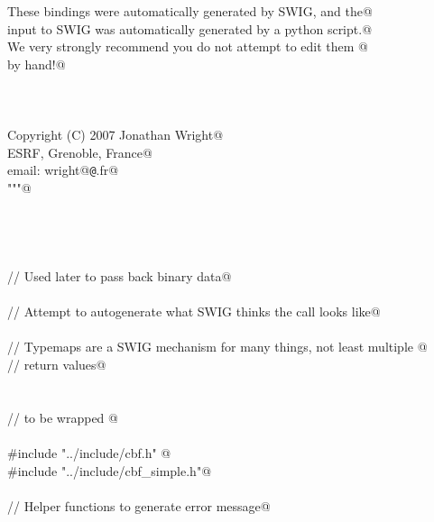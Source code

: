\documentclass[10pt,a4paper,twoside,notitlepage]{article}
\begin{document}
\begin{flushleft}
\begin{list}{}{}
\mbox{}\verb@ These bindings were automatically generated by SWIG, and the@\\
\mbox{}\verb@ input to SWIG was automatically generated by a python script.@\\
\mbox{}\verb@ We very strongly recommend you do not attempt to edit them @\\
\mbox{}\verb@ by hand!@\\
\mbox{}\verb@@\\
\mbox{}\verb@@\\
\mbox{}\verb@@\\
\mbox{}\verb@ Copyright (C) 2007    Jonathan Wright@\\
\mbox{}\verb@                       ESRF, Grenoble, France@\\
\mbox{}\verb@                email: wright@{\tt @}\verb@esrf.fr@\\
\mbox{}\verb@"""@\\
\mbox{}\verb@%}@\\
\mbox{}\verb@@\\
\mbox{}\verb@@\\
\mbox{}\verb@@\\
\mbox{}\verb@@\\
\mbox{}\verb@// Used later to pass back binary data@\\
\mbox{}\verb@%include "cstring.i"@\\
\mbox{}\verb@@\\
\mbox{}\verb@// Attempt to autogenerate what SWIG thinks the call looks like@\\
\mbox{}\verb@@\\
\mbox{}\verb@// Typemaps are a SWIG mechanism for many things, not least multiple @\\
\mbox{}\verb@// return values@\\
\mbox{}\verb@%include "typemaps.i"@\\
\mbox{}\verb@@\\
\mbox{}\verb@@\\
\mbox{}\verb@%{  // Here is the c code needed to compile the wrappers, but not @\\
\mbox{}\verb@    // to be wrapped @\\
\mbox{}\verb@@\\
\mbox{}\verb@#include "../include/cbf.h"          @\\
\mbox{}\verb@#include "../include/cbf_simple.h"@\\
\mbox{}\verb@@\\
\mbox{}\verb@// Helper functions to generate error message@\\

\end{list}
\end{flushleft}
\end{document}
